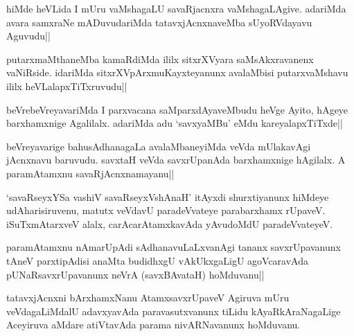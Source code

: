 
\begin{artha}
hiMde heVLida I mUru vaMshagaLU savaRjacnxra vaMshagaLAgive. adariMda 
avara samxraNe mADuvudariMda tatavxjAcnxnaveMba sUyoRVdayavu Aguvudu||
\end{artha}


\begin{artha}
putarxmaMthaneMba kamaRdiMda ililx sitxrXVyara saMsAkxravanenx 
vaNiRside. idariMda sitxrXVpArxmuKayxteyanunx avalaMbisi 
putarxvaMshavu ililx heVLalapxTiTxruvudu||
\end{artha}


\begin{artha}
beVrebeVreyavariMda I parxvacana saMparxdAyaveMbudu heVge Ayito, 
hAgeye barxhamxnige Agalilalx. adariMda adu `savxyaMBu' eMdu 
kareyalapxTiTxde||
\end{artha}

\begin{artha}
beVreyavarige bahusAdhanagaLa avalaMbaneyiMda veVda mUlakavAgi 
jAcnxnavu baruvudu. savxtaH veVda savxrUpanAda barxhamxnige hAgilalx. 
A paramAtamxnu savaRjAcnxnamayanu||
\end{artha}


\begin{artha}
`savaRseyxYSa vashiV savaRseyxVshAnaH' itAyxdi shurxtiyanunx hiMdeye 
udAharisiruvenu, matutx veVdavU paradeVvateye parabarxhamx rUpaveV. 
iSuTxmAtarxveV alalx, carAcarAtamxkavAda yAvudoMdU paradeVvateyeV.
\end{artha}


\begin{artha}
paramAtamxnu nAmarUpAdi sAdhanavuLaLxvanAgi tananx savxrUpavanunx 
tAneV parxtipAdisi anaMta budidhxgU vAkUkxgaLigU agoVcaravAda 
pUNaRsavxrUpavanunx neVrA (savxBAvataH) hoMduvanu||
\end{artha}

\begin{artha}
tatavxjAcnxni bArxhamxNanu AtamxsavxrUpaveV Agiruva mUru 
veVdagaLiMdalU adavxyavAda paravasutxvanunx tiLidu kAyaRkAraNagaLige 
Aceyiruva aMdare atiVtavAda parama nivARNavanunx hoMduvanu.
\end{artha}

